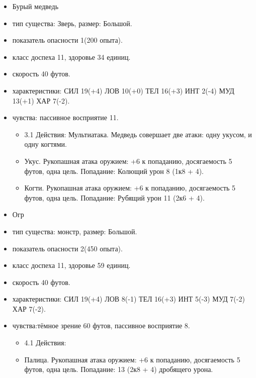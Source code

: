 	\begin{itemize}
		\item Бурый медведь
		\item тип существа: Зверь, размер: Большой.
		\item показатель опасности 1(200 опыта).
		\item класс доспеха 11, здоровье 34 единиц.
		\item скорость 40 футов.
		\item характеристики: СИЛ 19(+4) ЛОВ 10(+0) ТЕЛ 16(+3) ИНТ 2(-4) МУД 13(+1) ХАР 7(-2).
		\item чувства: пассивное восприятие 11.
		\begin{itemize}
			\item 3.1 Действия: Мультиатака. Медведь совершает две атаки: одну укусом, и одну когтями.
			\item Укус. Рукопашная атака оружием: +6 к попаданию, досягаемость 5 футов, одна цель. Попадание: Колющий урон 8 (1к8 + 4).
			\item Когти. Рукопашная атака оружием: +6 к попаданию, досягаемость 5 футов, одна цель. Попадание: Рубящий урон 11 (2к6 + 4).
		\end{itemize}
	\end{itemize}
	\begin{itemize}
		\item Огр
		\item тип существа: монстр, размер: Большой.
		\item показатель опасности 2(450 опыта).
		\item класс доспеха 11, здоровье 59 единиц.
		\item скорость 40 футов.
		\item характеристики: СИЛ 19(+4) ЛОВ 8(-1) ТЕЛ 16(+3) ИНТ 5(-3) МУД 7(-2) ХАР 7(-2).
		\item чувства:тёмное зрение 60 футов, пассивное восприятие 8.
		\begin{itemize}
			\item 4.1 Действия:
			\item Палица. Рукопашная атака оружием: +6 к попаданию, досягаемость 5 футов, одна цель. Попадание: 13 (2к8 + 4) дробящего урона.
		\end{itemize}
	\end{itemize}


